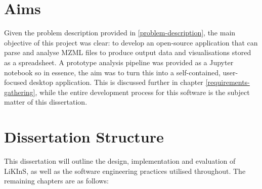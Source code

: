 \documentclass{l4proj}
\begin{document}
\section{Aims}
Given the problem description provided in \ref{problem-description}, the main objective of this project was clear: to develop an open-source application that can parse and analyse MZML files to produce output data and visualisations stored as a spreadsheet. A prototype analysis pipeline was provided as a Jupyter notebook so in essence, the aim was to turn this into a self-contained, user-focused desktop application. This is discussed further in chapter \ref{requirements-gathering}, while the entire development process for this software is the subject matter of this dissertation.


\section{Dissertation Structure}
This dissertation will outline the design, implementation and evaluation of LiKInS, as well as the software engineering practices utilised throughout. The remaining chapters are as follows:
\end{document}
